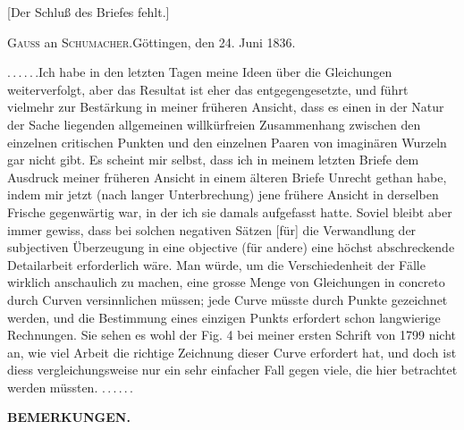 \par\noindent{}\par
\begin{center}\small[Der Schluß des Briefes fehlt.]\end{center}
\begin{center}\large\textsc{Gauss} an \textsc{Schumacher}.\quad Göttingen, den 24. Juni 1836.\end{center}
\noindent .\,.\,.\,.\,.\,.\quad Ich habe in den letzten Tagen meine Ideen über die Gleichungen
weiterverfolgt, aber das Resultat ist eher das entgegengesetzte, und führt vielmehr
zur Bestärkung in meiner früheren Ansicht, dass es einen in der Natur
der Sache liegenden allgemeinen willkürfreien Zusammenhang zwischen den
einzelnen critischen Punkten und den einzelnen Paaren von imaginären Wurzeln
gar nicht gibt. Es scheint mir selbst, dass ich in meinem letzten Briefe dem
Ausdruck meiner früheren Ansicht in einem älteren Briefe Unrecht gethan
habe, indem mir jetzt (nach langer Unterbrechung) jene frühere Ansicht 
 in derselben Frische gegenwärtig war, in der ich sie damals aufgefasst
hatte. Soviel bleibt aber immer gewiss, dass bei solchen negativen Sätzen [für]
die Verwandlung der subjectiven Überzeugung in eine objective (für andere)
\clearpage
{}
\noindent eine höchst abschreckende Detailarbeit erforderlich wäre. Man würde, um
die Verschiedenheit der Fälle wirklich anschaulich zu machen, eine grosse
Menge von Gleichungen in concreto durch Curven versinnlichen müssen; jede
Curve müsste durch Punkte gezeichnet werden, und die Bestimmung eines
einzigen Punkts erfordert schon langwierige Rechnungen. Sie sehen es wohl
der Fig. 4 bei meiner ersten Schrift von 1799 nicht an, wie viel Arbeit die
richtige Zeichnung dieser Curve erfordert hat, und doch ist diess vergleichungsweise
nur ein sehr einfacher Fall gegen viele, die hier betrachtet werden
müssten. .\,.\,.\,.\,.\,.
\par\bigskip\begin{center}\textbf{BEMERKUNGEN.}\end{center}
